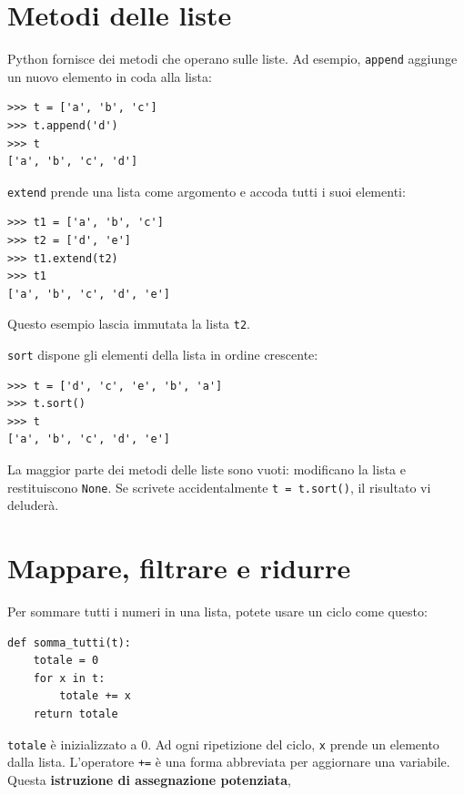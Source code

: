 \documentclass[10pt]{book}
\begin{document}
\section{Metodi delle liste}

Python fornisce dei metodi che operano sulle liste. Ad esempio,
{\tt append} aggiunge un nuovo elemento in coda alla lista:

\begin{verbatim}
>>> t = ['a', 'b', 'c']
>>> t.append('d')
>>> t
['a', 'b', 'c', 'd']
\end{verbatim}
%
{\tt extend} prende una lista come argomento e accoda tutti i suoi elementi:

\begin{verbatim}
>>> t1 = ['a', 'b', 'c']
>>> t2 = ['d', 'e']
>>> t1.extend(t2)
>>> t1
['a', 'b', 'c', 'd', 'e']
\end{verbatim}
%
Questo esempio lascia immutata la lista {\tt t2}.

{\tt sort} dispone gli elementi della lista in ordine crescente:

\begin{verbatim}
>>> t = ['d', 'c', 'e', 'b', 'a']
>>> t.sort()
>>> t
['a', 'b', 'c', 'd', 'e']
\end{verbatim}
%
La maggior parte dei metodi delle liste sono vuoti: modificano la lista e restituiscono {\tt None}. Se scrivete accidentalmente  {\tt t = t.sort()}, il risultato vi deluderà.


\section{Mappare, filtrare e ridurre}
\label{filter}

Per sommare tutti i numeri in una lista, potete usare un ciclo come questo:


\begin{verbatim}
def somma_tutti(t):
    totale = 0
    for x in t:
        totale += x
    return totale
\end{verbatim}
%
{\tt totale} è inizializzato a 0. Ad ogni ripetizione del ciclo,
{\tt x} prende un elemento dalla lista. L'operatore {\tt +=} è una forma abbreviata per aggiornare una variabile. Questa
{\bf istruzione di assegnazione potenziata},
\end{document}
